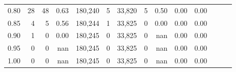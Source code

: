 \begin{tabular}{rrrrrrrrrrrrrr}
0.80 &      28 &     48 &  0.63 &  180,240 &        5 &  33,820 &       5 &  0.50 &  0.00 &      0.00 \\
0.85 &       4 &      5 &  0.56 &  180,244 &        1 &  33,825 &       0 &  0.00 &  0.00 &      0.00 \\
0.90 &       1 &      0 &  0.00 &  180,245 &        0 &  33,825 &       0 &   nan &  0.00 &      0.00 \\
0.95 &       0 &      0 &   nan &  180,245 &        0 &  33,825 &       0 &   nan &  0.00 &      0.00 \\
1.00 &       0 &      0 &   nan &  180,245 &        0 &  33,825 &       0 &   nan &  0.00 &      0.00 \\
\bottomrule
\end{tabular}
